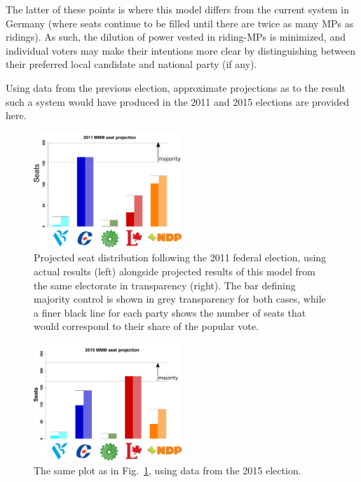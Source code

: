 \documentclass[DIV=calc, paper=a4, fontsize=11pt, twocolumn]{scrartcl}	 %
\begin{document}
The latter of these points is where this model differs from the current system in Germany (where seats continue to be filled until there are twice as many MPs as ridings). As such, the dilution of power vested in riding-MPs is minimized,  and individual voters may make their intentions more clear by distinguishing between their preferred local candidate and national party (if any).

Using data from the previous election, approximate projections as to the result such a system would have produced in the 2011 and 2015 elections are provided here.


\begin{figure}[h!]
  \includegraphics[width=0.50\textwidth,clip]{Figs/2011_seat_projection}
  \caption{Projected seat distribution following the 2011 federal election, using actual results (left) alongside projected results of this model from the same electorate in transparency (right). The bar defining majority control is shown in grey transparency for both cases, while a finer black line for each party shows the number of seats that would correspond to their share of the popular vote.
}
\label{fig:hypo_2011_sum}
\end{figure}


\begin{figure}[h!]
  \includegraphics[width=0.50\textwidth,clip]{Figs/2015_seat_projection}
  \caption{The same plot as in Fig.~\ref{fig:hypo_2011_sum}, using data from the 2015 election.}
\label{fig:hypo_2015_sum}
\end{figure}
\end{document}
